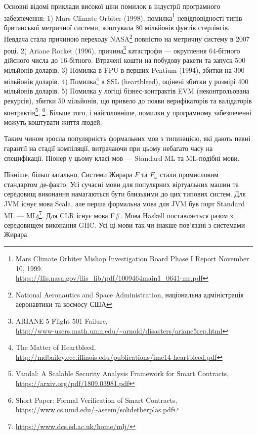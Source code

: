 Основні відомі приклади високої ціни помилок в індустрії програмного забезпечення:
1) Mars Climate Orbiter (1998),
   помилка\footnote{Mars Climate Orbiter Mishap Investigation Board Phase I Report November 10, 1999. \\
                    \url{https://llis.nasa.gov/llis_lib/pdf/1009464main1_0641-mr.pdf}}
   невідповідності типів британської метричної системи, коштувала 80 мільйонів фунтів стерлінгів.
   Невдача стала причиною переходу
   NASA\footnote{National Aeronautics and Space Administration, національна адміністрація аеронавтики та космосу США}
   повністю на метричну систему в 2007 році.
2) Ariane Rocket (1996),
   причина\footnote{ARIANE 5 Flight 501 Failure, \\
          \url{http://www-users.math.umn.edu/~arnold/disasters/ariane5rep.html}}
   катастрофи --- округлення 64-бітного дійсного числа до 16-бітного.
   Втрачені кошти на побудову ракети та запуск 500 мільйонів доларів.
3) Помилка в FPU в перших Pentium (1994), збитки на 300 мільйонів доларів.
4) Помилка\footnote{The Matter of Heartbleed. \\
                    \url{http://mdbailey.ece.illinois.edu/publications/imc14-heartbleed.pdf}}
   в SSL (heartbleed), оцінені збитки у розмірі 400 мільйонів доларів.
5) Помилка у логіці бізнес-контрактів EVM (неконтрольована рекурсія), збитки 50 мільйонів,
   що привело до появи верифікаторів та валідаторів
   контрактів\footnote{Vandal: A Scalable Security Analysis Framework for Smart Contracts, \\
                       \url{https://arxiv.org/pdf/1809.03981.pdf}},
             \footnote{Short Paper: Formal Verification of Smart Contracts, \\
                       \url{https://www.cs.umd.edu/~aseem/solidetherplas.pdf}}.
Більше того, і найголовніше, помилки у програмному забезпеченні можуть коштувати життя людей.

Таким чином зросла популярність формальних мов з типизацією, які дають певні гарантії
на стадії компіляції, витрачаючи при цьому небагато часу на специфікації. Піонер у цьому класі
мов --- Standard ML та ML-подібні мови.

Пізніше, більш загально, Системи Жирара $F$ та $F_\omega$ стали промисловим стандартом де-факто.
Усі сучасні мови для популярних віртуальних машин та середовищ виконання намагаються бути
близькими до цих типових систем. Для JVM існує мова Scala, але перша формальна мова для
JVM був порт Standard ML --- MLj\footnote{\url{https://www.dcs.ed.ac.uk/home/mlj/}}.
Для CLR існує мова F\#. Мова Haskell поставляється разом
з середовищем виконання GHC. Усі ці мови так чи інакше пов'язані з системами Жирара.


